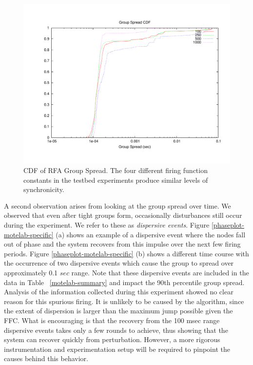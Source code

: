 \begin{figure}
\begin{center}
\includegraphics[width=0.8\hsize]{./figures/CDFTOT.pdf} 
\end{center} 
\caption{CDF of RFA Group Spread. The four different firing function
constants in the testbed experiments produce similar levels of
synchronicity.}
\label{groupspread-cdf} 
\end{figure} 



A second observation arises from looking at the group spread over
time. We observed that even after tight groups form, occasionally
disturbances still occur during the experiment. We refer to these as
{\em dispersive events}. Figure \ref{phaseplot-motelab-specific} (a)
shows an example of a dispersive event where the nodes fall out of
phase and the system recovers from this impulse over the next few
firing periods. Figure \ref{phaseplot-motelab-specific} (b) shows a
different time course with the occurrence of two dispersive events
which cause the group to spread over approximately 0.1 $sec$
range. Note that these dispersive events are included in the data in
Table ~\ref{motelab-summary} and impact the 90th percentile group
spread. Analysis of the information collected during this experiment
showed no clear reason for this spurious firing. It is unlikely to be
caused by the algorithm, since the extent of dispersion is larger than
the maximum jump possible given the FFC. What is encouraging is that
the recovery from the 100 msec range dispersive events takes only a
few rounds to achieve, thus showing that the system can recover
quickly from perturbation. However, a more rigorous instrumentation
and experimentation setup will be required to pinpoint the causes
behind this behavior.

